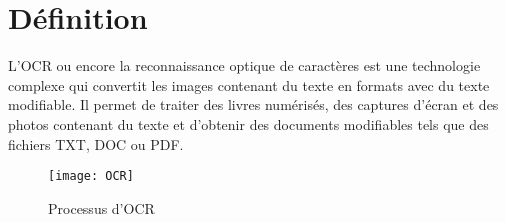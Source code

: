 \section{Définition}
L'OCR ou encore la reconnaissance optique de caractères est une technologie complexe qui convertit les images contenant du texte en formats avec du texte modifiable. Il permet de traiter des livres numérisés, des captures d'écran et des photos contenant du texte et d'obtenir des documents modifiables tels que des fichiers TXT, DOC ou PDF.
\begin{figure}
    \centering
    \texttt{[image: OCR]}
    \caption{Processus d'OCR}
\end{figure}